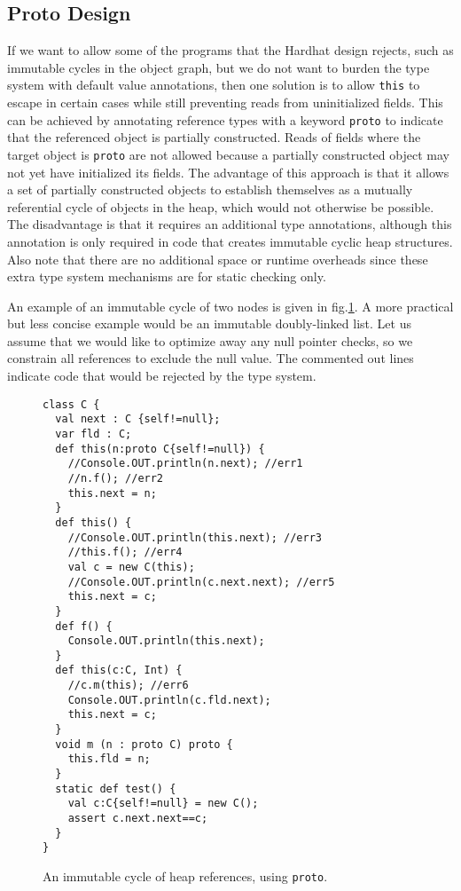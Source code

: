 \subsection{Proto Design}

If we want to allow some of the programs that the Hardhat design rejects, such
as immutable cycles in the object graph, but we do not want to burden the type
system with default value annotations, then one solution is to allow
\texttt{this} to escape in certain cases while still preventing reads from
uninitialized fields.  This can be achieved by annotating reference types with
a keyword \texttt{proto} to indicate that the referenced object is partially
constructed.  Reads of fields where the target object is \texttt{proto}
are not allowed because a partially constructed object may not yet have
initialized its fields.  The advantage of this approach is that it allows a set
of partially constructed objects to establish themselves as a mutually
referential cycle of objects in the heap, which would not otherwise be possible.
The disadvantage is that it requires an additional type annotations, although this
annotation is only required in code that creates immutable cyclic heap
structures.  Also note that there are no additional space or runtime overheads
since these extra type system mechanisms are for static checking only.

An example of an immutable cycle of two nodes is given in
fig.\ref{Figure:Cyclic}.  A more practical but less concise example would be an
immutable doubly-linked list.  Let us assume that we would like to optimize
away any null pointer checks, so we constrain all references to exclude the
null value.  The commented out lines indicate code that would be rejected by
the type system.

\begin{figure}
\vspace{-0.2cm}\begin{lstlisting}
class C {
  val next : C {self!=null};
  var fld : C;
  def this(n:proto C{self!=null}) {
    //Console.OUT.println(n.next); //err1
    //n.f(); //err2
    this.next = n;
  }
  def this() {
    //Console.OUT.println(this.next); //err3
    //this.f(); //err4
    val c = new C(this);
    //Console.OUT.println(c.next.next); //err5
    this.next = c;
  }
  def f() {
    Console.OUT.println(this.next);
  }
  def this(c:C, Int) {
    //c.m(this); //err6
    Console.OUT.println(c.fld.next);
    this.next = c;
  }
  void m (n : proto C) proto {
    this.fld = n;
  }
  static def test() {
    val c:C{self!=null} = new C();
    assert c.next.next==c;
  }
}
\end{lstlisting}\vspace{-0.2cm}
\caption{An immutable cycle of heap references, using \texttt{proto}.}
\label{Figure:Cyclic}
\end{figure}

